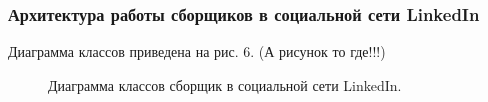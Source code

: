 \subsubsection{Архитектура работы сборщиков в социальной сети LinkedIn}
\par
Диаграмма классов приведена на рис. 6. (А рисунок то где!!!)

\begin{figure}[H]
    \caption{Диаграмма классов сборщик в социальной сети LinkedIn.}
    \label{ris:image}
\end{figure}

